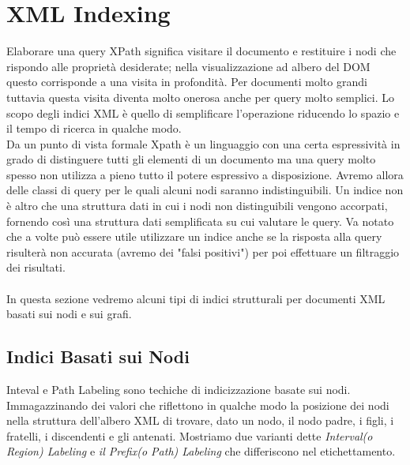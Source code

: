 \chapter{XML Indexing}
Elaborare una query XPath significa visitare il documento e restituire i nodi che rispondo alle proprietà desiderate; nella visualizzazione ad albero del DOM questo corrisponde a una visita in profondità. Per documenti molto grandi tuttavia questa visita diventa molto onerosa anche per query molto semplici. Lo scopo degli indici XML è quello di semplificare l'operazione riducendo lo spazio e il tempo di ricerca in qualche modo.\\
Da un punto di vista formale Xpath è un linguaggio con una certa espressività in grado di distinguere tutti gli elementi di un documento ma una query molto spesso non utilizza a pieno tutto il potere espressivo a disposizione. Avremo allora delle classi di query per le quali alcuni nodi saranno indistinguibili. Un indice non è altro che una struttura dati in cui i nodi non distinguibili vengono accorpati, fornendo così una struttura dati semplificata su cui valutare le query. Va notato che a volte può essere utile utilizzare un indice anche se la risposta alla query risulterà non accurata (avremo dei "falsi positivi") per poi effettuare un filtraggio dei risultati.\\\\
In questa sezione vedremo alcuni tipi di indici strutturali per documenti XML basati sui nodi e sui grafi.
\section{Indici Basati sui Nodi}
Inteval e Path Labeling sono techiche di indicizzazione basate sui nodi. Immagazzinando dei valori che riflettono in qualche modo la posizione dei nodi nella struttura dell'albero XML di trovare, dato un nodo, il nodo padre, i figli, i fratelli, i discendenti e gli antenati. Mostriamo due varianti dette \emph{Interval(o Region) Labeling} e \emph{il Prefix(o Path) Labeling} che differiscono nel etichettamento.

